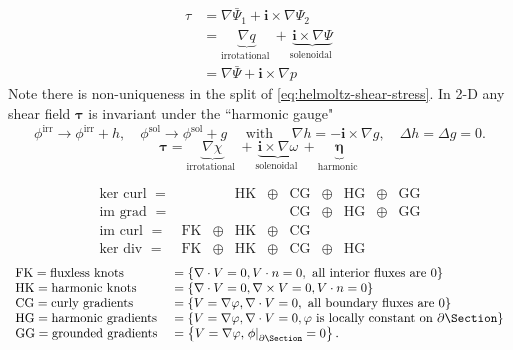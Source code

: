 \begin{equation}
\begin{aligned}
 \tau &= \nabla \bar{\Psi}_1 + \mathbf{i}\times\nabla\Psi_2 \\
&=\underbrace{\nabla q}_{\text {irrotational }}+\underbrace{\mathbf{i}\times \nabla \Psi}_{\text {solenoidal }} \\
&=\nabla \bar{\Psi}+\mathbf{i}\times \nabla p
\end{aligned}
\end{equation}
Note there is non-uniqueness in the split of \eqref{eq:helmoltz-shear-stress}. In 2-D any shear field \(\bm{\tau}\) is invariant under the ``harmonic gauge"
$$
\phi^{\mathrm{irr}} \rightarrow \phi^{\mathrm{irr}}+h, \quad \phi^{\mathrm{sol}} \rightarrow \phi^{\mathrm{sol}}+g \quad \text { with } \quad \nabla h=-\mathbf{i} \times \nabla g,
\quad \Delta h=\Delta g=0 .
$$
\begin{equation*}
\boldsymbol{\tau}=\underbrace{\nabla \chi}_{\text {irrotational }}+\underbrace{\mathbf{i} \times \nabla \omega}_{\text {solenoidal }}+\underbrace{\boldsymbol{\eta}}_{\text {harmonic }}
\end{equation*}

\begin{equation}
\begin{array}{lccccccccc}
\mathrm{ker} \text { curl }= &  && \mathrm{HK} &\oplus& \mathrm{CG}& \oplus& \mathrm{HG} &\oplus& \mathrm{GG} \\
\mathrm{im } \text { grad }= &  &&             &      & \mathrm{CG} &\oplus& \mathrm{HG} &\oplus& \mathrm{GG} \\
\mathrm{im } \text { curl }= & \mathrm{FK} &\oplus& \mathrm{HK} &\oplus& \mathrm{CG} &\\
\mathrm{ker} \text { div  }= & \mathrm{FK} &\oplus& \mathrm{HK} &\oplus& \mathrm{CG} &\oplus& \mathrm{HG}
\end{array}
\end{equation}
\begin{equation}
\begin{array}{ll}
\mathrm{FK}=\text{fluxless knots } &=\{\nabla \cdot V=0, V \cdot n=0, \text { all interior fluxes are } 0\} \\
\mathrm{HK}=\text{harmonic knots } &=\{\nabla \cdot V=0, \nabla\times V=0, V \cdot n=0\} \\
\mathrm{CG}=\text{curly gradients} &=\{V=\nabla\varphi, \nabla\cdot V=0, \text { all boundary fluxes are } 0\} \\
\mathrm{HG}=\text{harmonic gradients}&=\{V=\nabla\varphi, \nabla\cdot V=0, \varphi \text{ is locally constant on } \partial \Section\} \\
\mathrm{GG}=\text {grounded gradients }&=\left\{V=\nabla \varphi,\left.\phi\right|_{\partial \Section}=0\right\} .
\end{array}
\end{equation}


